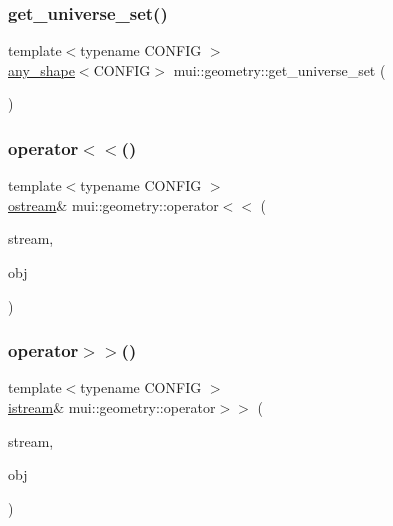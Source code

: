 \subsubsection{\texorpdfstring{get\+\_\+universe\+\_\+set()}{get\_universe\_set()}}
{\footnotesize\ttfamily template$<$typename C\+O\+N\+F\+IG $>$ \\
\hyperlink{classmui_1_1geometry_1_1any__shape}{any\+\_\+shape}$<$C\+O\+N\+F\+IG$>$ mui\+::geometry\+::get\+\_\+universe\+\_\+set (\begin{DoxyParamCaption}{ }\end{DoxyParamCaption})}

\mbox{\label{namespacemui_1_1geometry_a0cccec0b58337c40aac12b3e79b3e077}} 
\subsubsection{\texorpdfstring{operator$<$$<$()}{operator<<()}}
{\footnotesize\ttfamily template$<$typename C\+O\+N\+F\+IG $>$ \\
\hyperlink{classmui_1_1ostream}{ostream}\& mui\+::geometry\+::operator$<$$<$ (\begin{DoxyParamCaption}\item[{\hyperlink{classmui_1_1ostream}{ostream} \&}]{stream,  }\item[{const \hyperlink{classmui_1_1geometry_1_1shape}{shape}$<$ C\+O\+N\+F\+IG $>$ \&}]{obj }\end{DoxyParamCaption})}

\mbox{\label{namespacemui_1_1geometry_a634dc6cb5fb8052448ee1079111ddc50}} 
\subsubsection{\texorpdfstring{operator$>$$>$()}{operator>>()}}
{\footnotesize\ttfamily template$<$typename C\+O\+N\+F\+IG $>$ \\
\hyperlink{classmui_1_1istream}{istream}\& mui\+::geometry\+::operator$>$$>$ (\begin{DoxyParamCaption}\item[{\hyperlink{classmui_1_1istream}{istream} \&}]{stream,  }\item[{\hyperlink{classmui_1_1geometry_1_1shape}{shape}$<$ C\+O\+N\+F\+IG $>$ \&}]{obj }\end{DoxyParamCaption})}

